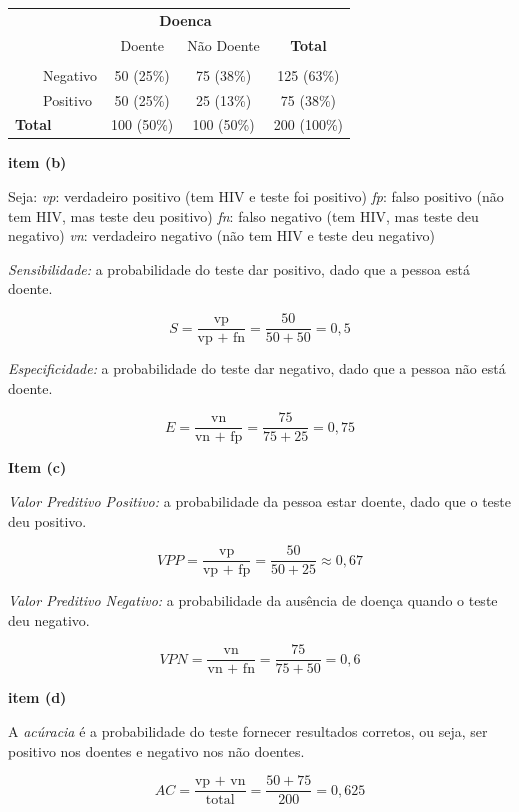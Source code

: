 \documentclass[
]{book}
\begin{document}
\begin{table}[t]
\fontsize{12.0pt}{14.4pt}\selectfont
\begin{tabular*}{\linewidth}{@{\extracolsep{\fill}}lccc}
\toprule
 & \multicolumn{2}{c}{\textbf{Doenca}} &  \\ 
\cmidrule(lr){2-3}
 & Doente & Não Doente & \textbf{Total} \\ 
\midrule\addlinespace[2.5pt]
{\bfseries Teste} &  &  &  \\ 
    Negativo & 50 (25\%) & 75 (38\%) & 125 (63\%) \\ 
    Positivo & 50 (25\%) & 25 (13\%) & 75 (38\%) \\ 
{\bfseries Total} & 100 (50\%) & 100 (50\%) & 200 (100\%) \\ 
\bottomrule
\end{tabular*}
\end{table}

\textbf{item (b)}

Seja:
\emph{vp}: verdadeiro positivo (tem HIV e teste foi positivo)
\emph{fp}: falso positivo (não tem HIV, mas teste deu positivo)
\emph{fn}: falso negativo (tem HIV, mas teste deu negativo)
\emph{vn}: verdadeiro negativo (não tem HIV e teste deu negativo)

\emph{Sensibilidade:} a probabilidade do teste dar positivo, dado que a pessoa está doente.

\[
S = \frac{\text{vp}}{\text{vp + fn}} = \frac{50}{50 + 50} = 0,5
\]

\emph{Especificidade:} a probabilidade do teste dar negativo, dado que a pessoa não está doente.

\[
E = \frac{\text{vn}}{\text{vn + fp}} = \frac{75}{75+25} = 0,75
\]

\textbf{Item (c)}

\emph{Valor Preditivo Positivo:} a probabilidade da pessoa estar doente, dado que o teste deu positivo.

\[
VPP = \frac{\text{vp}}{\text{vp + fp}} = \frac{50}{50+25} \approx 0,67
\]

\emph{Valor Preditivo Negativo:} a probabilidade da ausência de doença quando o teste deu negativo.

\[
VPN = \frac{\text{vn}}{\text{vn + fn}} = \frac{75}{75+50} = 0,6
\]

\textbf{item (d)}

A \emph{acúracia} é a probabilidade do teste fornecer resultados corretos, ou seja, ser positivo nos doentes e negativo nos não doentes.

\[
AC = \frac{\text{vp + vn}}{\text{total}} = \frac{50 +75}{200} = 0,625
\]
\end{document}
